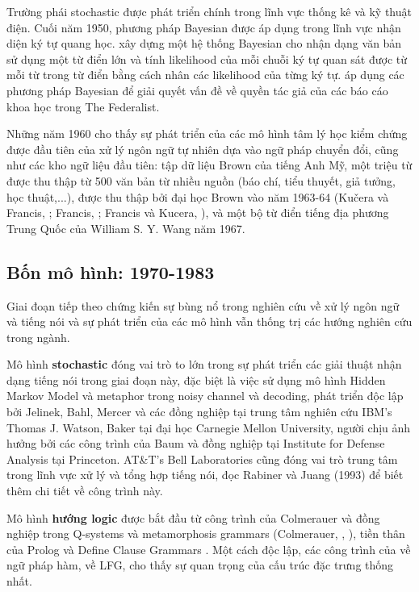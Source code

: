 Trường phái stochastic được phát triển chính trong lĩnh vực thống kê và kỹ thuật điện. Cuối năm 1950, phương pháp Bayesian được áp dụng trong lĩnh vực nhận diện ký tự quang học. \citet{bledsoe1959pattern} xây dựng một hệ thống Bayesian cho nhận dạng văn bản sử dụng một từ điển lớn và tính likelihood của mỗi chuỗi ký tự quan sát được từ mỗi từ trong từ điển bằng cách nhân các likelihood của từng ký tự. \citet{mosteller1964inference} áp dụng các phương pháp Bayesian để giải quyết vấn đề về quyền tác giả của các báo cáo khoa học trong The Federalist.

Những năm 1960 cho thấy sự phát triển của các mô hình tâm lý học kiểm chứng được đầu tiên của xử lý ngôn ngữ tự nhiên dựa vào ngữ pháp chuyển đổi, cũng như các kho ngữ liệu đầu tiên: tập dữ liệu Brown của tiếng Anh Mỹ, một triệu từ được thu thập từ 500 văn bản từ nhiều nguồn (báo chí, tiểu thuyết, giả tưởng, học thuật,...), được thu thập bởi đại học Brown vào năm 1963-64 (Kučera và Francis, \citeyear{kuvcera1967computational}; Francis, \citeyear{francis1979}; Francis và Kucera, \citeyear{francis1982frequency}), và một bộ từ điển tiếng địa phương Trung Quốc của William S. Y. Wang năm 1967.

\subsection{Bốn mô hình: 1970-1983}

Giai đoạn tiếp theo chứng kiến sự bùng nổ trong nghiên cứu về xử lý ngôn ngữ và tiếng nói và sự phát triển của các mô hình vẫn thống trị các hướng nghiên cứu trong ngành.

Mô hình \textbf{stochastic} đóng vai trò to lớn trong sự phát triển các giải thuật nhận dạng tiếng nói trong giai đoạn này, đặc biệt là việc sử dụng mô hình Hidden Markov Model và metaphor trong noisy channel và decoding, phát triển độc lập bởi Jelinek, Bahl, Mercer và các đồng nghiệp tại trung tâm nghiên cứu IBM's Thomas J. Watson, Baker tại đại học Carnegie Mellon University, người chịu ảnh hưởng bởi các công trình của Baum và đồng nghiệp tại Institute for Defense Analysis tại Princeton. AT\&T's Bell Laboratories cũng đóng vai trò trung tâm trong lĩnh vực xử lý và tổng hợp tiếng nói, đọc Rabiner và Juang (1993) để biết thêm chi tiết về công trình này.

Mô hình \textbf{hướng logic} được bắt đầu từ công trình của Colmerauer và đồng nghiệp trong Q-systems và metamorphosis grammars (Colmerauer, \citeyear{colmerauer1970systemes}, \citeyear{colmerauer1975grammaires}), tiền thân của Prolog và Define Clause Grammars \citep{pereira1980definite}. Một cách độc lập, các công trình của \citet{kaym1979} về ngữ pháp hàm, \citet{bresnan1982introduction} về LFG, cho thấy sự quan trọng của cấu trúc đặc trưng thống nhất.

